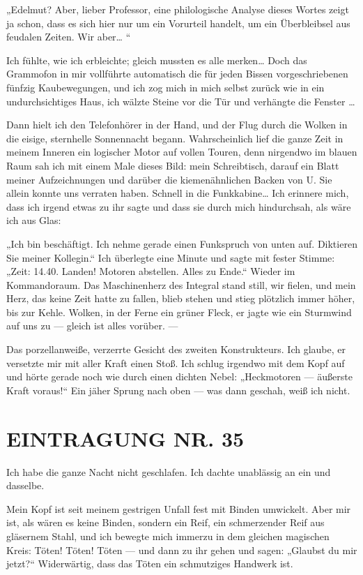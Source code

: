 „Edelmut? Aber, lieber Professor, eine philologische Analyse dieses
Wortes zeigt ja schon, dass es sich hier nur um ein Vorurteil
handelt, um ein Überbleibsel aus feudalen Zeiten. Wir aber\ldots{} “

Ich fühlte, wie ich erbleichte; gleich mussten es alle merken\ldots{}
Doch das Grammofon in mir vollführte automatisch die für jeden
Bissen vorgeschriebenen fünfzig Kaubewegungen, und ich zog mich in
mich selbst zurück wie in ein undurchsichtiges Haus, ich wälzte
Steine vor die Tür und verhängte die Fenster \ldots{}

Dann hielt ich den Telefonhörer in der Hand, und der Flug durch die
Wolken in die eisige, sternhelle Sonnennacht begann. Wahrscheinlich
lief die ganze Zeit in meinem Inneren ein logischer Motor auf
vollen Touren, denn nirgendwo im blauen Raum sah ich mit einem Male
dieses Bild: mein Schreibtisch, darauf ein Blatt meiner
Aufzeichnungen und darüber die kiemenähnlichen Backen von U. Sie
allein konnte uns verraten haben. Schnell in die Funkkabine\ldots{} Ich
erinnere mich, dass ich irgend etwas zu ihr sagte und dass sie
durch mich hindurchsah, als wäre ich aus Glas:

„Ich bin beschäftigt. Ich nehme gerade einen Funkspruch von unten
auf. Diktieren Sie meiner Kollegin.“ Ich überlegte eine Minute und
sagte mit fester Stimme: „Zeit: 14.40. Landen! Motoren abstellen.
Alles zu Ende.“ Wieder im Kommandoraum. Das Maschinenherz des
Integral stand still, wir fielen, und mein Herz, das keine Zeit
hatte zu fallen, blieb stehen und stieg plötzlich immer höher, bis
zur Kehle. Wolken, in der Ferne ein grüner Fleck, er jagte wie ein
Sturmwind auf uns zu — gleich ist alles vorüber. —

Das porzellanweiße, verzerrte Gesicht des zweiten Konstrukteurs.
Ich glaube, er versetzte mir mit aller Kraft einen Stoß. Ich schlug
irgendwo mit dem Kopf auf und hörte gerade noch wie durch einen
dichten Nebel: „Heckmotoren — äußerste Kraft voraus!“ Ein jäher
Sprung nach oben — was dann geschah, weiß ich nicht.

\section{EINTRAGUNG NR. 35}

Ich habe die ganze Nacht nicht geschlafen. Ich dachte unablässig an
ein und dasselbe.

Mein Kopf ist seit meinem gestrigen Unfall fest mit Binden
umwickelt. Aber mir ist, als wären es keine Binden, sondern ein
Reif, ein schmerzender Reif aus gläsernem Stahl, und ich bewegte
mich immerzu in dem gleichen magischen Kreis: Töten! Töten! Töten —
und dann zu ihr gehen und sagen: „Glaubst du mir jetzt?“
Widerwärtig, dass das Töten ein schmutziges Handwerk ist.

